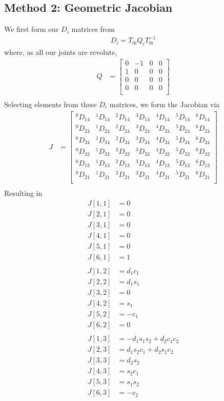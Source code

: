 \documentclass{article}
\begin{document}
\subsection{Method 2: Geometric Jacobian}
We first form our $D_i$ matrices from
\begin{align*}
D_i = T_{0i} Q_i T_{0i}^{-1}
\end{align*}
where, as all our joints are revolute,
\begin{align*}
Q &=
\left[\begin{matrix}
    0 & -1 & 0 & 0 \\
    1 &  0 & 0 & 0 \\
    0 &  0 & 0 & 0 \\
    0 &  0 & 0 & 0 \\
\end{matrix}\right] \\
\end{align*}
Selecting elements from these $D_i$ matrices, we form the Jacobian via
\begin{align*}
J &=
\left[\begin{matrix}
^0D_{14} & ^1D_{14} & ^2D_{14} & ^3D_{14} & ^4D_{14} & ^5D_{14} & ^6D_{14} \\
^0D_{24} & ^1D_{24} & ^2D_{24} & ^3D_{24} & ^4D_{24} & ^5D_{24} & ^6D_{24} \\
^0D_{34} & ^1D_{34} & ^2D_{34} & ^3D_{34} & ^4D_{34} & ^5D_{34} & ^6D_{34} \\
^0D_{32} & ^1D_{32} & ^2D_{32} & ^3D_{32} & ^4D_{32} & ^5D_{32} & ^6D_{32} \\
^0D_{13} & ^1D_{13} & ^2D_{13} & ^3D_{13} & ^4D_{13} & ^5D_{13} & ^6D_{13} \\
^0D_{21} & ^1D_{21} & ^2D_{21} & ^3D_{21} & ^4D_{21} & ^5D_{21} & ^6D_{21} \\
\end{matrix}\right] \\
\end{align*}
Resulting in
\begin{align*}
J[1,1] &= 0 \\
J[2,1] &= 0 \\
J[3,1] &= 0 \\
J[4,1] &= 0 \\
J[5,1] &= 0 \\
J[6,1] &= 1 \\
\\
J[1,2] &= d_{1} c_{1} \\
J[2,2] &= d_{1} s_{1} \\
J[3,2] &= 0 \\
J[4,2] &= s_{1} \\
J[5,2] &= - c_{1} \\
J[6,2] &= 0 \\
\\
J[1,3] &= - d_{1} s_{1} s_{2} + d_{2} c_{1} c_{2} \\
J[2,3] &= d_{1} s_{2} c_{1} + d_{2} s_{1} c_{2} \\
J[3,3] &= d_{2} s_{2} \\
J[4,3] &= s_{2} c_{1} \\
J[5,3] &= s_{1} s_{2} \\
J[6,3] &= - c_{2} \\
\end{align*}
\end{document}
